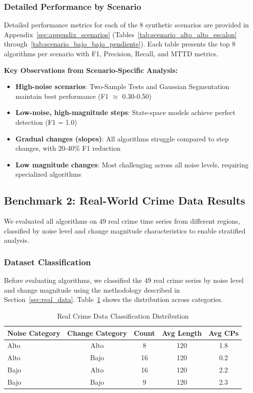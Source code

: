 \subsubsection{Detailed Performance by Scenario}

Detailed performance metrics for each of the 8 synthetic scenarios are provided in Appendix~\ref{sec:appendix_scenarios} (Tables~\ref{tab:scenario_alto_alto_escalon} through~\ref{tab:scenario_bajo_bajo_pendiente}). Each table presents the top 8 algorithms per scenario with F1, Precision, Recall, and MTTD metrics.

\textbf{Key Observations from Scenario-Specific Analysis:}
\begin{itemize}
    \item \textbf{High-noise scenarios}: Two-Sample Tests and Gaussian Segmentation maintain best performance (F1 $\approx$ 0.30-0.50)
    \item \textbf{Low-noise, high-magnitude steps}: State-space models achieve perfect detection (F1 = 1.0)
    \item \textbf{Gradual changes (slopes)}: All algorithms struggle compared to step changes, with 20-40\% F1 reduction
    \item \textbf{Low magnitude changes}: Most challenging across all noise levels, requiring specialized algorithms
\end{itemize}


\subsection{Benchmark 2: Real-World Crime Data Results}
\label{sec:results_real}

We evaluated all algorithms on 49 real crime time series from different regions, classified by noise level and change magnitude characteristics to enable stratified analysis.

\subsubsection{Dataset Classification}

Before evaluating algorithms, we classified the 49 real crime series by noise level and change magnitude using the methodology described in Section~\ref{sec:real_data}. Table~\ref{tab:real_classification} shows the distribution across categories.

\begin{table}[H]
\centering
\caption{Real Crime Data Classification Distribution}
\label{tab:real_classification}
\small
\begin{tabular}{lcccc}
\toprule
\textbf{Noise Category} & \textbf{Change Category} & \textbf{Count} & \textbf{Avg Length} & \textbf{Avg CPs} \\
\midrule
Alto & Alto & 8 & 120 & 1.8 \\
Alto & Bajo & 16 & 120 & 0.2 \\
Bajo & Alto & 16 & 120 & 2.2 \\
Bajo & Bajo & 9 & 120 & 2.3 \\
\bottomrule
\end{tabular}
\end{table}

